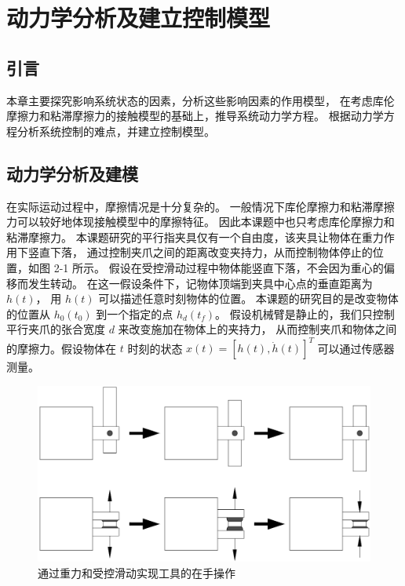 \chapter{动力学分析及建立控制模型}

\section{引言}
本章主要探究影响系统状态的因素，分析这些影响因素的作用模型，
在考虑库伦摩擦力和粘滞摩擦力的接触模型的基础上，推导系统动力学方程。
根据动力学方程分析系统控制的难点，并建立控制模型。

\section{动力学分析及建模}

在实际运动过程中，摩擦情况是十分复杂的。
一般情况下库伦摩擦力和粘滞摩擦力可以较好地体现接触模型中的摩擦特征。
因此本课题中也只考虑库伦摩擦力和粘滞摩擦力。
本课题研究的平行指夹具仅有一个自由度，该夹具让物体在重力作用下竖直下落，
通过控制夹爪之间的距离改变夹持力，从而控制物体停止的位置，如图 2-1 所示。
假设在受控滑动过程中物体能竖直下落，不会因为重心的偏移而发生转动。
在这一假设条件下，记物体顶端到夹具中心点的垂直距离为$h(t)$，
用 $h(t)$ 可以描述任意时刻物体的位置。
本课题的研究目的是改变物体的位置从 ${h_0}({t_0})$ 到一个指定的点 ${h_d}({t_f})$。
假设机械臂是静止的，我们只控制平行夹爪的张合宽度 $d$ 来改变施加在物体上的夹持力，
从而控制夹爪和物体之间的摩擦力。假设物体在 $t$ 时刻的状态 $x(t) = {\left[ {h(t),\dot h(t)} \right]^T}$ 可以通过传感器测量。

\begin{figure}[!ht]
  \centering
  \includegraphics[scale=0.45]{chapter02/pic/2-1}
  \caption{通过重力和受控滑动实现工具的在手操作}
  \label{fig:2-1}
  \vspace{-0.3cm}
\end{figure}

